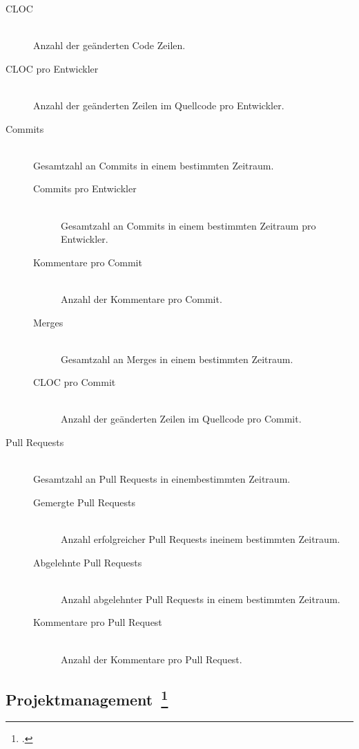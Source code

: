 \begin{description}
  \item[\ac{CLOC}] \hfill \\ Anzahl der geänderten Code Zeilen.
  \item[\ac{CLOC} pro Entwickler] \hfill \\ Anzahl der geänderten Zeilen im Quellcode pro Entwickler.
  \item[Commits] \hfill \\ Gesamtzahl an Commits in einem bestimmten Zeitraum.
  \begin{description}
    \item[Commits pro Entwickler] \hfill \\ Gesamtzahl an Commits in einem bestimmten Zeitraum pro Entwickler.
    \item[Kommentare pro Commit] \hfill \\ Anzahl der Kommentare pro Commit.
    \item[Merges] \hfill \\ Gesamtzahl an Merges in einem bestimmten Zeitraum.
    \item[\ac{CLOC} pro Commit] \hfill \\ Anzahl der geänderten Zeilen im Quellcode pro Commit.
  \end{description}
  \item[Pull Requests] \hfill \\ Gesamtzahl an Pull Requests in einembestimmten Zeitraum.
  \begin{description}
    \item[Gemergte Pull Requests] \hfill \\ Anzahl erfolgreicher Pull Requests ineinem bestimmten Zeitraum.
    \item[Abgelehnte Pull Requests] \hfill \\ Anzahl abgelehnter Pull Requests in einem bestimmten Zeitraum.
    \item[Kommentare pro Pull Request] \hfill \\ Anzahl der Kommentare pro Pull Request.
  \end{description}
\end{description}

\newpage
\subsection[Projektmanagement]{Projektmanagement~\footcite[vgl.][S.37ff]{davis_agile_2015}}

